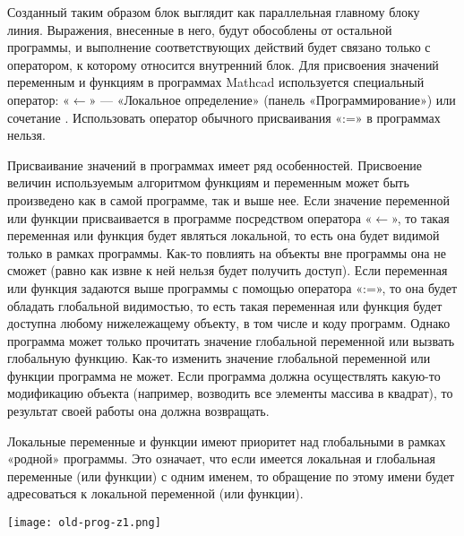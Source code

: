 Созданный таким образом блок выглядит как параллельная главному блоку линия. Выражения, внесенные в него, будут обособлены от остальной программы, и выполнение соответствующих действий будет связано только с оператором, к которому относится внутренний блок.
Для присвоения значений переменным и функциям в программах Mathcad используется специальный оператор: «$\leftarrow$» --- «Локальное определение» (панель «Программирование») или сочетание \keys{\shift + [} . Использовать оператор обычного присваивания «:=» в программах нельзя.

Присваивание значений в программах имеет ряд особенностей. Присвоение величин используемым алгоритмом функциям и переменным может быть произведено как в самой программе, так и выше нее. Если значение переменной или функции присваивается в программе посредством оператора «$\leftarrow$», то такая переменная или функция будет являться локальной, то есть она будет видимой только в рамках программы. Как-то повлиять на объекты вне программы она не сможет (равно как извне к ней нельзя будет получить доступ). Если переменная или функция задаются выше программы с помощью оператора «:=», то она будет обладать глобальной видимостью, то есть такая переменная или функция будет доступна любому нижележащему объекту, в том числе и коду программ. Однако программа может только прочитать значение глобальной переменной или вызвать глобальную функцию. Как-то изменить значение глобальной переменной или функции программа не может. Если программа должна осуществлять какую-то модификацию объекта (например, возводить все элементы массива в квадрат), то результат своей работы она должна возвращать.

Локальные переменные и функции имеют приоритет над глобальными в рамках «родной» программы. Это означает, что если имеется локальная и глобальная переменные (или функции) с одним именем, то обращение по этому имени будет адресоваться к локальной переменной (или функции).


\begin{center}
	\texttt{[image: old-prog-z1.png]}
\end{center}


